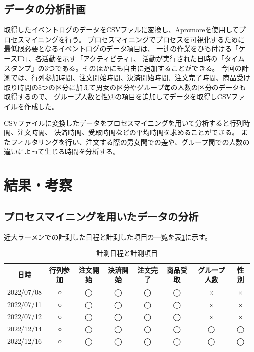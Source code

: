 \documentclass{jsarticle}
\begin{document}
\subsection{データの分析計画}
取得したイベントログのデータをCSVファルに変換し、Apromoreを使用してプロセスマイニングを行う。
プロセスマイニングでプロセスを可視化するために最低限必要となるイベントログのデータ項目は、
一連の作業をひも付ける「ケースID」、各活動を示す「アクティビティ」、
活動が実行された日時の「タイムスタンプ」の3つである。そのほかにも自由に追加することができる。
今回の計測では、行列参加時間、注文開始時間、決済開始時間、注文完了時間、商品受け取り時間の5つの区分に加えて男女の区分やグループ毎の人数の区分のデータも取得するので、
グループ人数と性別の項目を追加してデータを取得しCSVファイルを作成した。

CSVファイルに変換したデータをプロセスマイニングを用いて分析すると行列時間、注文時間、
決済時間、受取時間などの平均時間を求めることができる。
またフィルタリングを行い、注文する際の男女間での差や、グループ間での人数の違いによって生じる時間を分析する。




\newpage

\section{結果・考察}

\subsection{プロセスマイニングを用いたデータの分析}
近大ラーメンでの計測した日程と計測した項目の一覧を表\ref{table5}に示す。


\begin{table}[H]
 \begin{center}
   \caption{計測日程と計測項目}
   \begin{tabular}{|c|c|c|c|c|c|c|c|} \hline
日時 & 行列参加 & 注文開始 & 決済開始 & 注文完了 & 商品受取 & グループ人数 & 性別 \\ \hline \hline
2022/07/08 & ○ & ◯ & ◯ & ◯ & ◯ & × & × \\ \hline
2022/07/11 & ○ & ◯ & ◯ & ◯ & ◯ & × & × \\ \hline
2022/07/12 & ○ & ◯ & ◯ & ◯ & ◯ & × & × \\ \hline
2022/12/14 & ○ & ◯ & ◯ & ◯ & ◯ & ◯ & ◯ \\ \hline
2022/12/16 & ○ & ◯ & ◯ & ◯ & ◯ & ◯ & ◯ \\ \hline
  \end{tabular}
 \label{table5}
 \end{center}
\end{table}
\end{document}
